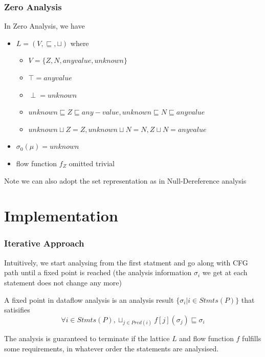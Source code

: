 \documentclass[]{beamer}
\begin{document}
\begin{frame}
  \frametitle{Zero Analysis}
  In Zero Analysis, we have
  \begin{itemize}
    \item $L=(V, \sqsubseteq, \sqcup)$ where
      \begin{itemize}
      \item $V=\{Z, N, anyvalue, unknown\}$
      \item $\top = anyvalue$
      \item $\perp = unknown$
      \item $unknown \sqsubseteq Z \sqsubseteq any-value, unknown \sqsubseteq N \sqsubseteq anyvalue$
      \item $unknown \sqcup Z = Z, unknown \sqcup N = N, Z \sqcup N = anyvalue$
      \end{itemize}
    \item $\sigma_0(\mu) = unknown$
    \item flow function $f_{Z}$ omitted trivial
  \end{itemize}

  \pause
  Note we can also adopt the set representation as in Null-Dereference
  analysis
\end{frame}

\section{Implementation}
\frame{\tableofcontents[currentsection]}

\begin{frame}
  \frametitle{Iterative Approach}
  Intuitively, we start analysing from the first statment and go along with CFG path until
  a \alert{fixed point} is reached (the analysis
  information $\sigma_i$ we get at each statement does not change any more)

  \vspace{1em}\pause
  A fixed point in dataflow analysis is an analysis result
  $\{\sigma_i | i \in Stmts(P)\}$ that satisifies
  $$\forall i \in Stmts(P), \sqcup_{j \in Pred(i)}f[j](\sigma_j) \sqsubseteq \sigma_i $$

  \vspace{1em}\pause
  The analysis is guaranteed to terminate if the lattice $L$ and flow function $f$ fulfills
  some requirements, in whatever order the statements are analysised.
\end{frame}
\end{document}

